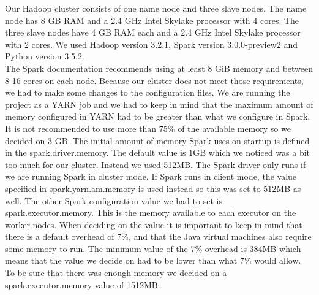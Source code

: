 Our Hadoop cluster consists of one name node and three slave nodes.
The name node has 8 GB RAM and a 2.4 GHz Intel Skylake processor with 4 cores.
The three slave nodes have 4 GB RAM each and a 2.4 GHz Intel Skylake processor with 2 cores.
We used Hadoop version 3.2.1, Spark version 3.0.0-preview2 and Python version 3.5.2.
\\
The Spark documentation recommends using at least 8 GiB memory and between 8-16 cores on each node\cite{SparkHardware}. Because our cluster does not meet those requirements, we had to make some changes to the configuration files. We are running the project as a YARN job and we had to keep in mind that the maximum amount of memory configured in YARN had to be greater than what we configure in Spark. It is not recommended to use more than 75\% of the available memory so we decided on 3 GB. The initial amount of memory Spark uses on startup is defined in the spark.driver.memory. The default value is 1GB which we noticed was a bit too much for our cluster. Instead we used 512MB. The Spark driver only runs if we are running Spark in cluster mode. If Spark runs in client mode, the value specified in spark.yarn.am.memory is used instead so this was set to 512MB as well. The other Spark configuration value we had to set is spark.executor.memory. This is the memory available to each executor on the worker nodes. When deciding on the value it is important to keep in mind that there is a default overhead of 7\%, and that the Java virtual machines also require some memory to run. The minimum value of the 7\% overhead is 384MB\cite{SparkOverhead} which means that the value we decide on had to be lower than what 7\% would allow. To be sure that there was enough memory we decided on a spark.executor.memory value of 1512MB.